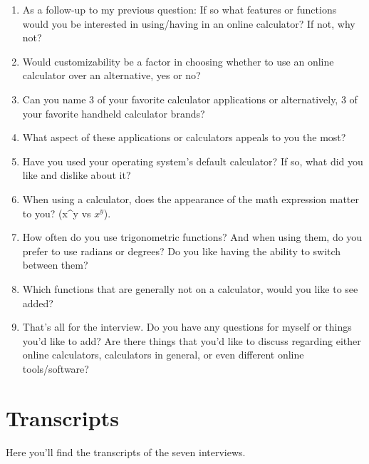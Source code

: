 \documentclass[11pt,onside]{report}
\begin{document}
\begin{enumerate}
    \item As a follow-up to my previous question: If so what features or functions would you be interested in using/having in an online calculator? If not, why not?
    \item Would customizability be a factor in choosing whether to use an online calculator over an alternative, yes or no?
    \item Can you name 3 of your favorite calculator applications or alternatively, 3 of your favorite handheld calculator brands?
    \item What aspect of these applications or calculators appeals to you the most?
    \item Have you used your operating system’s default calculator? If so, what did you like and dislike about it?
    \item When using a calculator, does the appearance of the math expression matter to you? (x\^{}y vs $x^y$).
    \item How often do you use trigonometric functions? And when using them, do you prefer to use radians or degrees? Do you like having the ability to switch between them?
    \item Which functions that are generally not on a calculator, would you like to see added?
    \item That’s all for the interview. Do you have any questions for myself or things you’d like to add? Are there things that you’d like to discuss regarding either online calculators, calculators in general, or even different online tools/software?
\end{enumerate}

\section{Transcripts}
    Here you'll find the transcripts of the seven interviews.
\end{document}
